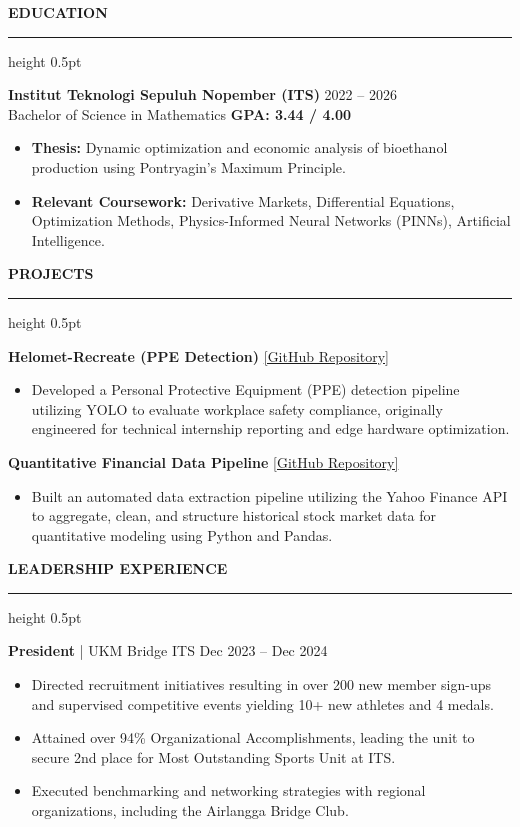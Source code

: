 \documentclass[11pt, letterpaper]{article}
\newcommand{\cvsection}[1]{%
    \vspace{0.8em}%
    {\large \textbf{\MakeUppercase{#1}}}%
    \vspace{0.2em}%
    \hrule height 0.5pt%
    \vspace{0.4em}%
}
\begin{document}
\cvsection{Education}
\textbf{Institut Teknologi Sepuluh Nopember (ITS)} \hfill 2022 -- 2026 \\
Bachelor of Science in Mathematics \hfill \textbf{GPA: 3.44 / 4.00}
\begin{itemize}[leftmargin=*, nosep]
    \item \textbf{Thesis:} Dynamic optimization and economic analysis of bioethanol production using Pontryagin's Maximum Principle.
    \item \textbf{Relevant Coursework:} Derivative Markets, Differential Equations, Optimization Methods, Physics-Informed Neural Networks (PINNs), Artificial Intelligence.
\end{itemize}

\cvsection{Projects}
\textbf{Helomet-Recreate (PPE Detection)} \hfill \href{https://github.com/Edriczz/helomet-recreate.git}{[GitHub Repository]}
\begin{itemize}[leftmargin=*, nosep]
    \item Developed a Personal Protective Equipment (PPE) detection pipeline utilizing YOLO to evaluate workplace safety compliance, originally engineered for technical internship reporting and edge hardware optimization.
\end{itemize}

\textbf{Quantitative Financial Data Pipeline} \hfill \href{https://github.com/Edriczz/Quant_Pipeline}{[GitHub Repository]}
\begin{itemize}[leftmargin=*, nosep]
    \item Built an automated data extraction pipeline utilizing the Yahoo Finance API to aggregate, clean, and structure historical stock market data for quantitative modeling using Python and Pandas.
\end{itemize}

\cvsection{Leadership Experience}
\textbf{President} | UKM Bridge ITS \hfill Dec 2023 -- Dec 2024
\begin{itemize}[leftmargin=*, nosep]
    \item Directed recruitment initiatives resulting in over 200 new member sign-ups and supervised competitive events yielding 10+ new athletes and 4 medals.
    \item Attained over 94\% Organizational Accomplishments, leading the unit to secure 2nd place for Most Outstanding Sports Unit at ITS.
    \item Executed benchmarking and networking strategies with regional organizations, including the Airlangga Bridge Club.
\end{itemize}
\end{document}
